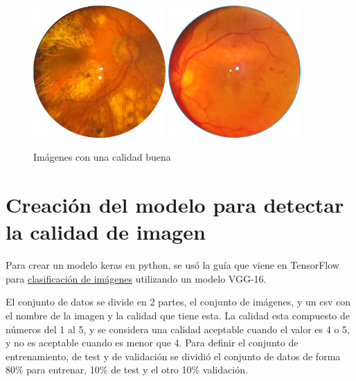 \begin{figure}[!ht]
    \centering
    \includegraphics[width=0.45\textwidth]{img/dataset/517191ED.PNG}
    \includegraphics[width=0.45\textwidth]{img/dataset/442507GI.png}
    \caption{Imágenes con una calidad buena}
    \label{fig:imagenes con calidad buena}
\end{figure}

\section{Creación del modelo para detectar la calidad de imagen}

Para crear un modelo keras en python, se usó la guía que viene en TensorFlow para \href{https://www.tensorflow.org/tutorials/images/classification?hl=es-419}{clasificación de imágenes}\cite{tensorflow-classification-tutorial} utilizando un modelo VGG-16.

El conjunto de datos se divide en 2 partes, el conjunto de imágenes, y un csv con el nombre de la imagen y la calidad que tiene esta.
La calidad esta compuesto de números del 1 al 5, y se considera una calidad aceptable cuando el valor es 4 o 5, y no es aceptable cuando es menor que 4. 
Para definir el conjunto de entrenamiento, de test y de validación se dividió el conjunto de datos de forma 80\% para entrenar, 10\% de test y el otro 10\% validación.

